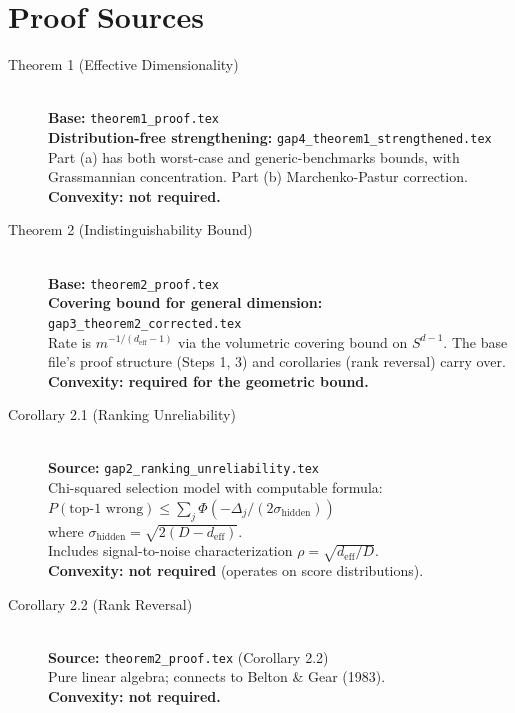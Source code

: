 
\section*{Proof Sources}

\begin{description}

\item[Theorem 1 (Effective Dimensionality)]~\\
  \textbf{Base:} \texttt{theorem1\_proof.tex}\\
  \textbf{Distribution-free strengthening:} \texttt{gap4\_theorem1\_strengthened.tex}\\
  Part (a) has both worst-case and generic-benchmarks bounds, with Grassmannian concentration. Part (b) Marchenko-Pastur correction.\\
  \textbf{Convexity: not required.}

\item[Theorem 2 (Indistinguishability Bound)]~\\
  \textbf{Base:} \texttt{theorem2\_proof.tex}\\
  \textbf{Covering bound for general dimension:} \texttt{gap3\_theorem2\_corrected.tex}\\
  Rate is $m^{-1/(d_{\mathrm{eff}}-1)}$ via the volumetric covering bound on $S^{d-1}$. The base file's proof structure (Steps 1, 3) and corollaries (rank reversal) carry over.\\
  \textbf{Convexity: required for the geometric bound.}

\item[Corollary 2.1 (Ranking Unreliability)]~\\
  \textbf{Source:} \texttt{gap2\_ranking\_unreliability.tex}\\
  Chi-squared selection model with computable formula:\\
  $P(\text{top-1 wrong}) \leq \sum_j \Phi(-\Delta_j / (2\sigma_{\mathrm{hidden}}))$\\
  where $\sigma_{\mathrm{hidden}} = \sqrt{2(D - d_{\mathrm{eff}})}$.\\
  Includes signal-to-noise characterization $\rho = \sqrt{d_{\mathrm{eff}}/D}$.\\
  \textbf{Convexity: not required} (operates on score distributions).

\item[Corollary 2.2 (Rank Reversal)]~\\
  \textbf{Source:} \texttt{theorem2\_proof.tex} (Corollary 2.2)\\
  Pure linear algebra; connects to Belton \& Gear (1983).\\
  \textbf{Convexity: not required.}


\end{description}
